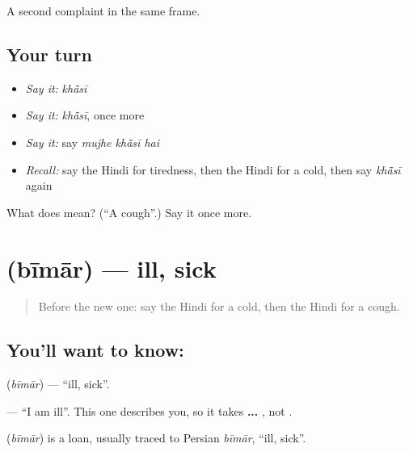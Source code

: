\begin{grammarlens}[title={What you've built}]
A second complaint in the same frame.
\end{grammarlens}

\subsection*{Your turn}
\begin{itemize}
\raggedright
  \item \emph{Say it:} \emph{khā̃sī}
  \item \emph{Say it:} \emph{khā̃sī}, once more
  \item \emph{Say it:} say \emph{mujhe khā̃sī hai}
  \item \emph{Recall:} say the Hindi for tiredness, then the Hindi for a cold, then say \emph{khā̃sī} again
\end{itemize}

\begin{tcolorbox}[breakable,colback=teal!4,colframe=teal!35!black,title={Before you move on}]
What does  mean? (\textquotedblleft{}A cough\textquotedblright{}.) Say it once more.
\end{tcolorbox}
\section[\texorpdfstring{\hi{बीमार} (bīmār)}{बीमार (bīmār)}]{ (bīmār) — ill, sick}

\label{lesson:HI-C106-bimar}



\begin{quote}
Before the new one: say the Hindi for a cold, then the Hindi for a cough.
\end{quote}

\subsection*{You'll want to know: }
\textbf{} (\emph{bīmār}) — \textquotedblleft{}ill, sick\textquotedblright{}.

\textbf{  } — \textquotedblleft{}I am ill\textquotedblright{}. This one describes you, so it takes \textbf{ ... }, not \textbf{}.

\begin{cousinweb}
\textbf{} (\emph{bīmār}) is a loan, usually traced to Persian \emph{bīmār}, \textquotedblleft{}ill, sick\textquotedblright{}.
\end{cousinweb}

